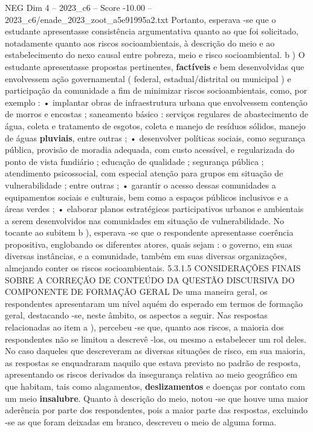 \begin{textsample}{NEG Dim 4 – 2023\_c6 – Score -10.00 – 2023\_c6/enade\_2023\_zoot\_a5e91995a2.txt}
Portanto, esperava -se que o estudante apresentasse consistência argumentativa quanto ao que foi solicitado, notadamente quanto aos riscos socioambientais, à descrição do meio e ao estabelecimento do nexo causal entre pobreza, meio e risco socioambiental. b ) O estudante apresentasse propostas pertinentes, \textbf{factíveis} e bem desenvolvidas que envolvessem ação governamental ( federal, estadual/distrital ou municipal ) e participação da comunidade a fim de minimizar riscos socioambientais, como, por exemplo : • implantar obras de infraestrutura urbana que envolvessem contenção de morros e encostas ; saneamento básico : serviços regulares de abastecimento de água, coleta e tratamento de esgotos, coleta e manejo de resíduos sólidos, manejo de águas \textbf{pluviais}, entre outras ; • desenvolver políticas sociais, como segurança pública, provisão de moradia adequada, com custo acessível, e regularizada do ponto de vista fundiário ; educação de qualidade ; segurança pública ; atendimento psicossocial, com especial atenção para grupos em situação de vulnerabilidade ; entre outras ; • garantir o acesso dessas comunidades a equipamentos sociais e culturais, bem como a espaços públicos inclusivos e a áreas verdes ; • elaborar planos estratégicos participativos urbanos e ambientais a serem desenvolvidos nas comunidades em situação de vulnerabilidade.
No tocante ao subitem b ), esperava -se que o respondente apresentasse coerência propositiva, englobando os diferentes atores, quais sejam : o governo, em suas diversas instâncias, e a comunidade, também em suas diversas organizações, almejando conter os riscos socioambientais. 5.3.1.5 CONSIDERAÇÕES FINAIS SOBRE A CORREÇÃO DE CONTEÚDO DA QUESTÃO DISCURSIVA DO COMPONENTE DE FORMAÇÃO GERAL De uma maneira geral, os respondentes apresentaram um nível aquém do esperado em termos de formação geral, destacando -se, neste âmbito, os aspectos a seguir.
Nas respostas relacionadas ao item a ), percebeu -se que, quanto aos riscos, a maioria dos respondentes não se limitou a descrevê -los, ou mesmo a estabelecer um rol deles.
No caso daqueles que descreveram as diversas situações de risco, em sua maioria, as respostas se enquadraram naquilo que estava previsto no padrão de resposta, apresentando os riscos derivados da insegurança relativa ao meio geográfico em que habitam, tais como alagamentos, \textbf{deslizamentos} e doenças por contato com um meio \textbf{insalubre}.
Quanto à descrição do meio, notou -se que houve uma maior aderência por parte dos respondentes, pois a maior parte das respostas, excluindo -se as que foram deixadas em branco, descreveu o meio de alguma forma.

\end{textsample}
